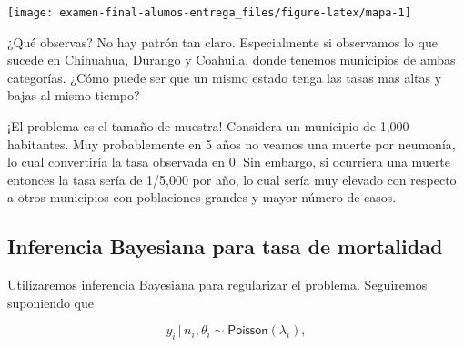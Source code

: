 \documentclass[
]{article}
\newenvironment{Shaded}{\begin{snugshade}}{\end{snugshade}}
\newcommand{\DataTypeTok}[1]{\textcolor[rgb]{0.13,0.29,0.53}{#1}}
\newcommand{\FloatTok}[1]{\textcolor[rgb]{0.00,0.00,0.81}{#1}}
\newcommand{\KeywordTok}[1]{\textcolor[rgb]{0.13,0.29,0.53}{\textbf{#1}}}
\newcommand{\NormalTok}[1]{#1}
\newcommand{\OperatorTok}[1]{\textcolor[rgb]{0.81,0.36,0.00}{\textbf{#1}}}
\newcommand{\StringTok}[1]{\textcolor[rgb]{0.31,0.60,0.02}{#1}}
\begin{document}
\begin{Shaded}
\end{Shaded}

\begin{center}\texttt{[image: examen-final-alumos-entrega\_files/figure-latex/mapa-1]} \end{center}

¿Qué observas? No hay patrón tan claro. Especialmente si observamos lo
que sucede en Chihuahua, Durango y Coahuila, donde tenemos municipios de
ambas categorías. ¿Cómo puede ser que un mismo estado tenga las tasas
mas altas y bajas al mismo tiempo?

¡El problema es el tamaño de muestra! Considera un municipio de 1,000
habitantes. Muy probablemente en 5 años no veamos una muerte por
neumonía, lo cual convertiría la tasa observada en 0. Sin embargo, si
ocurriera una muerte entonces la tasa sería de 1/5,000 por año, lo cual
sería muy elevado con respecto a otros municipios con poblaciones
grandes y mayor número de casos.

\hypertarget{inferencia-bayesiana-para-tasa-de-mortalidad}{%
\subsection{Inferencia Bayesiana para tasa de
mortalidad}\label{inferencia-bayesiana-para-tasa-de-mortalidad}}

Utilizaremos inferencia Bayesiana para regularizar el problema.
Seguiremos suponiendo que

\[ y_i \, | \, n_i, \theta_i \sim \textsf{Poisson}(\lambda_i),\]
\end{document}
